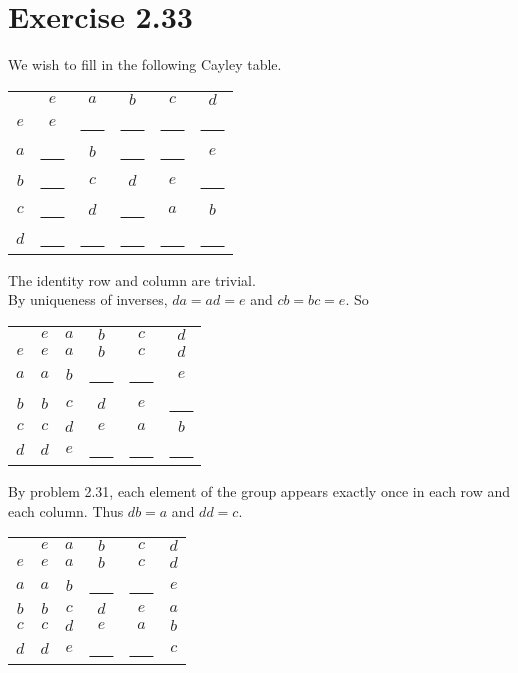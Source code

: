 \documentclass{article}
\begin{document}
\section*{Exercise 2.33}
We wish to fill in the following Cayley table.
\begin{center}
    \begin{tabular}{c | c c c c c}
        & $e$ & $a$ & $b$ & $c$ & $d$  \\
       \cline{1-6}
       $e$ & $e$         & \uline{\ \ \ } & \uline{\ \ \ } & \uline{\ \ \ } & \uline{\ \ \ } \\
       $a$ & \uline{\ \ \ } & $b$         & \uline{\ \ \ } & \uline{\ \ \ } & $e$ \\
       $b$ & \uline{\ \ \ } & $c$         & $d$         & $e$         & \uline{\ \ \ } \\
       $c$ & \uline{\ \ \ } & $d$         & \uline{\ \ \ } & $a$         & $b$ \\
       $d$ & \uline{\ \ \ } & \uline{\ \ \ } & \uline{\ \ \ } & \uline{\ \ \ } & \uline{\ \ \ } \\
   \end{tabular}
\end{center}
The identity row and column are trivial. \\
By uniqueness of inverses, \(da=ad=e\) and \(cb=bc=e\). So
\begin{center}
    \begin{tabular}{c | c c c c c}
        & $e$ & $a$ & $b$ & $c$ & $d$  \\
       \cline{1-6}
       $e$ & $e$ & $a$ & $b$ & $c$ & $d$ \\
       $a$ & $a$ & $b$         & \uline{\ \ \ } & \uline{\ \ \ } & $e$ \\
       $b$ & $b$ & $c$         & $d$         & $e$         & \uline{\ \ \ } \\
       $c$ & $c$ & $d$         & $e$         & $a$         & $b$ \\
       $d$ & $d$ & $e$ & \uline{\ \ \ } & \uline{\ \ \ } & \uline{\ \ \ } \\
   \end{tabular}
\end{center}
By problem 2.31, each element of the group appears exactly once in each row and each column. Thus \(db=a\) and \(dd=c\).
\begin{center}
    \begin{tabular}{c | c c c c c}
        & $e$ & $a$ & $b$ & $c$ & $d$  \\
       \cline{1-6}
       $e$ & $e$ & $a$ & $b$ & $c$ & $d$ \\
       $a$ & $a$ & $b$         & \uline{\ \ \ } & \uline{\ \ \ } & $e$ \\
       $b$ & $b$ & $c$ & $d$ & $e$ & $a$ \\
       $c$ & $c$ & $d$ & $e$ & $a$ & $b$ \\
       $d$ & $d$ & $e$ & \uline{\ \ \ } & \uline{\ \ \ } & $c$ \\
   \end{tabular}
\end{center}
\end{document}
